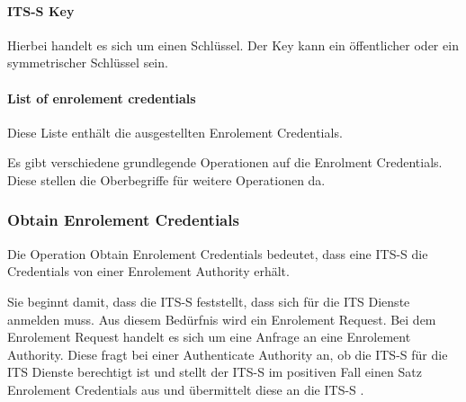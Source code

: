 \paragraph{ITS-S Key}
Hierbei handelt es sich um einen Schlüssel. Der Key kann ein öffentlicher oder ein symmetrischer Schlüssel sein. 

\paragraph{List of enrolement credentials}
Diese Liste enthält die ausgestellten Enrolement Credentials. 

Es gibt verschiedene grundlegende Operationen auf die Enrolment Credentials. Diese stellen die Oberbegriffe für weitere Operationen da. 


 
\subsubsection{Obtain Enrolement Credentials \label{architektur_obtainEnrolementCredentials}}
Die Operation Obtain Enrolement Credentials bedeutet, dass eine \ac{ITS-S} die Credentials von einer Enrolement Authority erhält. 

Sie beginnt damit, dass die \ac{ITS-S} feststellt, dass sich für die \ac{ITS} Dienste anmelden muss. Aus diesem Bedürfnis wird ein Enrolement Request. Bei dem Enrolement Request handelt es sich um eine Anfrage an eine Enrolement Authority. Diese fragt bei einer Authenticate Authority an, ob die \ac{ITS-S} für die \ac{ITS} Dienste berechtigt ist und stellt der \ac{ITS-S} im positiven Fall einen Satz Enrolement Credentials aus und übermittelt diese an die \ac{ITS-S} .  

